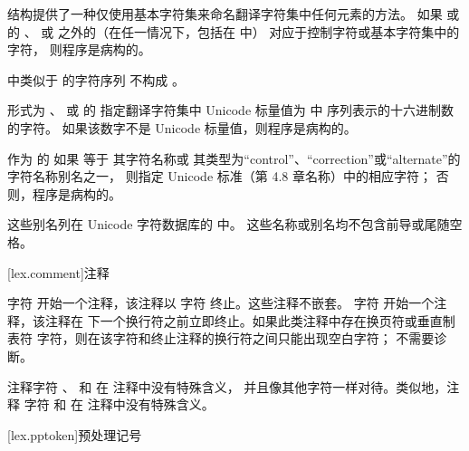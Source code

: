 \pnum
{} 结构提供了一种仅使用基本字符集来命名翻译字符集中任何元素的方法。
如果  或
 的 、 或
 之外的（在任一情况下，包括在  中）
对应于控制字符或基本字符集中的字符，
则程序是病构的。
\begin{note}
 中类似于  的字符序列
不构成 。
\end{note}

\pnum
形式为  、
   或
 的 
指定翻译字符集中
Unicode 标量值为
 中
 序列表示的十六进制数的字符。
如果该数字不是 Unicode 标量值，则程序是病构的。

\pnum
作为  的 
如果  等于
其字符名称或
其类型为“control”、“correction”或“alternate”的字符名称别名之一，
则指定 Unicode 标准（第 4.8 章名称）中的相应字符；
否则，程序是病构的。
\begin{note}
这些别名列在
Unicode 字符数据库的  中。
这些名称或别名均不包含前导或尾随空格。
\end{note}

[lex.comment]{注释}

\pnum
{}%
%
%
字符 \tcode{/*} 开始一个注释，该注释以
字符 \tcode{*/} 终止。这些注释不嵌套。
%
字符 \tcode{//} 开始一个注释，该注释在
下一个换行符之前立即终止。如果此类注释中存在换页符或垂直制表符
字符，则在该字符和终止注释的换行符之间只能出现空白字符；
不需要诊断。
\begin{note}
注释字符 \tcode{//}、\tcode{/*}
和 \tcode{*/} 在 \tcode{//} 注释中没有特殊含义，
并且像其他字符一样对待。类似地，注释
字符 \tcode{//} 和 \tcode{/*} 在
\tcode{/*} 注释中没有特殊含义。
\end{note}

[lex.pptoken]{预处理记号}

